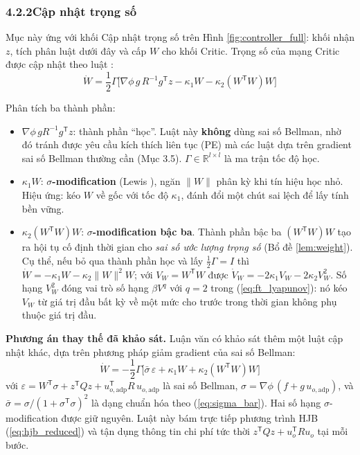 \documentclass[12pt,a4paper]{article}
\makeatletter
\newcommand{\seclabel}[2]{\phantomsection\protected@edef\@currentlabel{#2}\label{#1}}
\newcommand{\R}{\mathbb{R}}
\newcommand{\T}{\mathsf{T}}
\makeatother
\begin{document}
\subsubsection*{4.2.2\quad Cập nhật trọng số}
\seclabel{sec:ft_update}{4.2.2}

Mục này ứng với khối Cập nhật trọng số trên Hình \ref{fig:controller_full}: khối nhận $z$, tích phân luật dưới đây và cấp $W$ cho khối Critic. Trọng số của mạng Critic được cập nhật theo luật \cite{Wang2025}:
\begin{equation}\label{eq:ft_weight_update_wang}
    \dot{W} = \frac{1}{2}\Gamma\Big[\nabla\phi\, g\, R^{-1} g^\T z - \kappa_1 W - \kappa_2 (W^\T W) W\Big]
\end{equation}

Phân tích ba thành phần:

\begin{itemize}
    \item $\nabla\phi\, g R^{-1} g^\T z$: thành phần ``học''. Luật này \textbf{không} dùng sai số Bellman, nhờ đó tránh được yêu cầu kích thích liên tục (PE) mà các luật dựa trên gradient sai số Bellman thường cần (Mục 3.5). $\Gamma \in \R^{l \times l}$ là ma trận tốc độ học.

    \item $\kappa_1 W$: \textbf{$\sigma$-modification} (Lewis \cite{Lewis2012}), ngăn $\|W\|$ phân kỳ khi tín hiệu học nhỏ. Hiệu ứng: kéo $W$ về gốc với tốc độ $\kappa_1$, đánh đổi một chút sai lệch để lấy tính bền vững.

    \item $\kappa_2 (W^\T W) W$: \textbf{$\sigma$-modification bậc ba}. Thành phần bậc ba $(W^\T W)W$ tạo ra hội tụ cố định thời gian cho \textit{sai số ước lượng trọng số} (Bổ đề \ref{lem:weight}). Cụ thể, nếu bỏ qua thành phần học và lấy $\frac12\Gamma = I$ thì $\dot{W} = -\kappa_1 W - \kappa_2\|W\|^2 W$; với $V_W = W^\T W$ được $\dot{V}_W = -2\kappa_1 V_W - 2\kappa_2 V_W^2$. Số hạng $V_W^2$ đóng vai trò số hạng $\beta V^q$ với $q = 2$ trong (\ref{eq:ft_lyapunov}): nó kéo $V_W$ từ giá trị đầu bất kỳ về một mức cho trước trong thời gian không phụ thuộc giá trị đầu.
\end{itemize}

\textbf{Phương án thay thế đã khảo sát.} Luận văn có khảo sát thêm một luật cập nhật khác, dựa trên phương pháp giảm gradient của sai số Bellman:
\begin{equation}\label{eq:ft_weight_update}
    \dot{W} = -\frac{1}{2}\Gamma\Big[\bar{\sigma}\, \varepsilon + \kappa_1 W + \kappa_2 (W^\T W) W\Big]
\end{equation}
với $\varepsilon = W^\T \sigma + z^\T Q z + u_{o,\text{adp}}^\T R\, u_{o,\text{adp}}$ là sai số Bellman, $\sigma = \nabla\phi\,(f + g\,u_{o,\text{adp}})$, và $\bar{\sigma} = \sigma/(1 + \sigma^\T\sigma)^2$ là dạng chuẩn hóa theo (\ref{eq:sigma_bar}). Hai số hạng $\sigma$-modification được giữ nguyên. Luật này bám trực tiếp phương trình HJB (\ref{eq:hjb_reduced}) và tận dụng thông tin chi phí tức thời $z^\T Qz + u_o^\T Ru_o$ tại mỗi bước.
\end{document}
